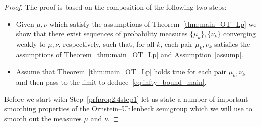 \documentclass[10pt]{amsart}
\theoremstyle{definition}\newtheorem{defi}[theo]{Definition}\newtheorem{rema}[theo]{Remark}\newtheorem{exam}[theo]{Example}\newtheorem{exem}[theo]{Example}\newtheorem{nota}[theo]{Notation}
\newcommand{\source}{\mu}
\newcommand{\target}{\nu}
\newcounter{setofstep}
\newcounter{step}[setofstep]
\begin{document}
\begin{proof}
The proof is based on the composition of the following two steps:
\begin{itemize}%
\item[Step~\ref{prfprop2.4step1}:] Given $\source,\target$ which satisfy the assumptions of Theorem~\ref{thm:main_OT_Lp} we show that there exist sequences of probability measures $\{\source_k\},\{\target_k\}$ converging weakly to $\source,\target$, respectively, such that, for all $k$, each pair $\source_k,\target_k$ satisfies the assumptions of Theorem~\ref{thm:main_OT_Lp} and Assumption~\ref{assump}.

\item[Step~\ref{prfprop2.4step2}:] Assume that Theorem~\ref{thm:main_OT_Lp} holds true for each pair $\source_k,\target_k$ and then pass to the limit to deduce~\eqref{eq:infty_bound_main}.
\end{itemize}

Before we start with Step~\ref{prfprop2.4step1} let us state a number of important smoothing properties of the Ornstein--Uhlenbeck semigroup which we will use to smooth out the measures $\source$ and $\target$.



\end{proof}
\end{document}
